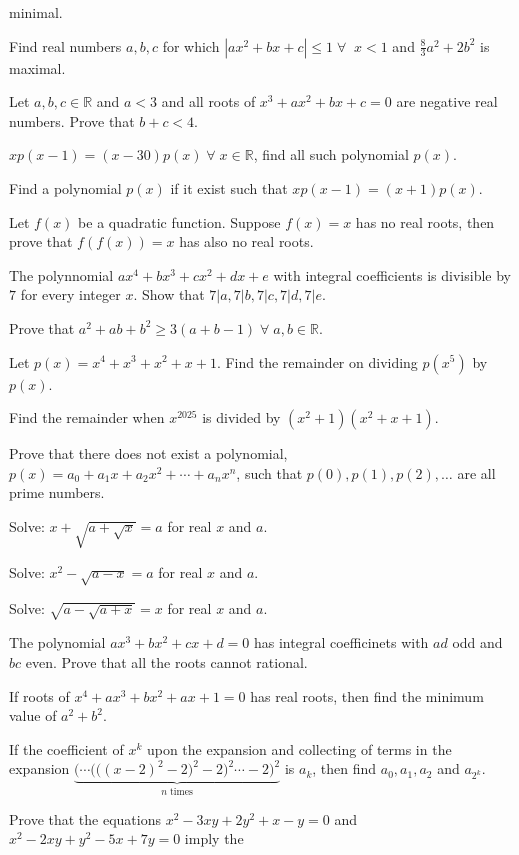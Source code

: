   minimal.
\item Find real numbers $a, b, c$ for which $|ax^2 + bx + c|\leq 1\;\forall\;\;x < 1$ and $\frac{8}{3}a^2 +
  2b^2$ is maximal.
\item Let $a, b, c\in\mathbb{R}$ and $a < 3$ and all roots of $x^3 + ax^2 + bx + c = 0$ are negative real
  numbers. Prove that $b + c < 4$.
\item $xp(x - 1) = (x - 30)p(x)\;\forall\;x\in\mathbb{R}$, find all such polynomial $p(x)$.
\item Find a polynomial $p(x)$ if it exist such that $xp(x - 1) = (x + 1)p(x)$.
\item Let $f(x)$ be a quadratic function. Suppose $f(x) = x$ has no real roots, then prove that $f(f(x)) =
  x$ has also no real roots.
\item The polynnomial $ax^4 + bx^3 + cx^2 + dx + e$ with integral coefficients is divisible by $7$ for every
  integer $x$. Show that $7|a, 7|b, 7|c, 7|d, 7|e$.
\item Prove that $a^2 + ab + b^2 \geq 3(a + b - 1)\;\forall\;a,b\in\mathbb{R}$.
\item Let $p(x) = x^4 + x^3 + x^2 + x + 1$. Find the remainder on dividing $p\left(x^5\right)$ by $p(x)$.
\item Find the remainder when $x^{2025}$ is divided by $(x^2 + 1)(x^2 + x + 1)$.
\item Prove that there does not exist a polynomial, $p(x) = a_0 + a_1x + a_2x^2 + \cdots + a_nx^n$, such
  that $p(0), p(1), p(2), \ldots$ are all prime numbers.
\item Solve: $x + \sqrt{a + \sqrt{x}} = a$ for real $x$ and $a$.
\item Solve: $x^2 - \sqrt{a - x} = a$ for real $x$ and $a$.
\item Solve: $\sqrt{a - \sqrt{a + x}} = x$ for real $x$ and $a$.
\item The polynomial $ax^3 + bx^2 + cx + d = 0$ has integral coefficinets with $ad$ odd and $bc$ even. Prove
  that all the roots cannot rational.
\item If roots of $x^4 + ax^3 + bx^2 + ax + 1 = 0$ has real roots, then find the minimum value of $a^2 +
  b^2$.
\item If the coefficient of $x^k$ upon the expansion and collecting of terms in the expansion
  $\underbrace{\bigg(\cdots\Big(\big((x - 2)^2 - 2\big)^2-2\Big)^2\cdots-2\bigg)^2}_{n\;\mathrm{times}}$ is
  $a_k$, then find $a_0, a_1, a_2$ and $a_{2^k}$.
\item Prove that the equations $x^2 - 3xy + 2y^2 + x - y = 0$ and $x^2 - 2xy + y^2 - 5x + 7y = 0$ imply the
